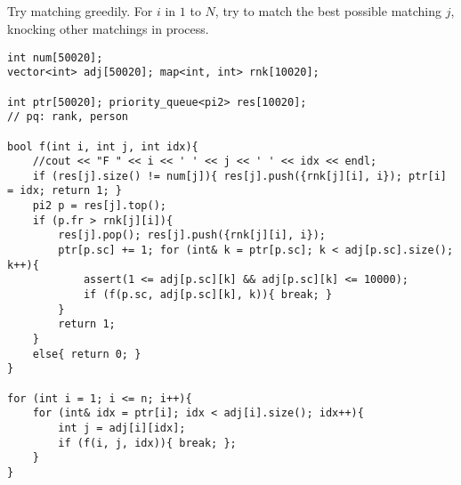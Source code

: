 \documentclass[landscape, 8pt, a4paper, oneside, twocolumn]{extarticle}
\begin{document}
\subsection{}
Try matching greedily. For $i$ in $1$ to $N$, try to match the best possible matching $j$, knocking other matchings in process.
\begin{verbatim}
int num[50020];
vector<int> adj[50020]; map<int, int> rnk[10020];

int ptr[50020]; priority_queue<pi2> res[10020];
// pq: rank, person

bool f(int i, int j, int idx){
    //cout << "F " << i << ' ' << j << ' ' << idx << endl;
    if (res[j].size() != num[j]){ res[j].push({rnk[j][i], i}); ptr[i] = idx; return 1; }
    pi2 p = res[j].top();
    if (p.fr > rnk[j][i]){
        res[j].pop(); res[j].push({rnk[j][i], i});
        ptr[p.sc] += 1; for (int& k = ptr[p.sc]; k < adj[p.sc].size(); k++){
			assert(1 <= adj[p.sc][k] && adj[p.sc][k] <= 10000);
            if (f(p.sc, adj[p.sc][k], k)){ break; }
        }
        return 1;
    }
    else{ return 0; }
}

for (int i = 1; i <= n; i++){
	for (int& idx = ptr[i]; idx < adj[i].size(); idx++){
		int j = adj[i][idx];
		if (f(i, j, idx)){ break; };
	}
}
\end{verbatim}
\end{document}

